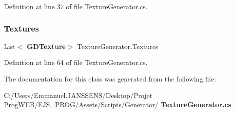 Definition at line 37 of file Texture\+Generator.\+cs.

\mbox{\label{class_texture_generator_af0db415f0e3a39172b94bf66cb98aceb}} 
\subsubsection{Textures}
{\footnotesize\ttfamily List$<$\textbf{ G\+D\+Texture}$>$ Texture\+Generator.\+Textures\hspace{0.3cm}{\ttfamily [get]}}



Definition at line 64 of file Texture\+Generator.\+cs.



The documentation for this class was generated from the following file\+:\begin{DoxyCompactItemize}
\item 
C\+:/\+Users/\+Emmanuel.\+J\+A\+N\+S\+S\+E\+N\+S/\+Desktop/\+Projet Prog\+W\+E\+B/\+E\+J\+S\+\_\+\+P\+R\+O\+G/\+Assets/\+Scripts/\+Generator/\textbf{ Texture\+Generator.\+cs}\end{DoxyCompactItemize}
